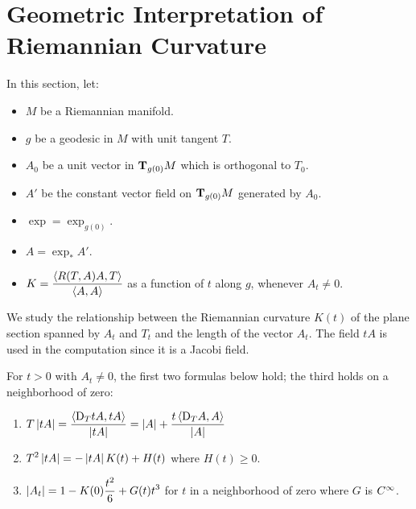 \documentclass[../main]{subfiles}
\begin{document}
\section{Geometric Interpretation of Riemannian Curvature}\label{ch10:s3}

In this section, let:
\begin{itemize}
    \item $M$ be a Riemannian manifold.
    \item $g$ be a geodesic in $M$ with unit tangent $T$.
    \item $A_0$ be a unit vector in $\ts{M}{g(0)}$ which is orthogonal to $T_0$.
    \item $A'$ be the constant vector field on $\ts{M}{g(0)}$ generated by $A_0$.
    \item $\exp = \exp_{g(0)}$.
    \item $A = \exp_*A'$.
    \item $K = \dfrac{\ip{R(T,A)A}{T}}{\ip AA}$ as a function of $t$ along $g$, whenever $A_t\ne0$.
\end{itemize}
We study the relationship between the Riemannian curvature $K(t)$ of the plane section spanned by $A_t$ and $T_t$ and the length of the vector $A_t$. The field $tA$ is used in the computation since it is a Jacobi field.



\begin{lemma} \label{lem:ch10.3.1}
For $t>0$ with $A_t\ne0$, the first two formulas below hold; the third holds on a neighborhood of zero:
\begin{enumerate}[label=(\arabic*)]
    
    \item \label{enu:ch10s3.1}
    $\displaystyle T\norm{tA} = \frac{\ip{\D_TtA}{tA}}{\norm{tA}}
    = \norm A + \frac{t\ip{\D_TA}{A}}{\norm A}$
    
    \item \label{enu:ch10s3.2}
    $\displaystyle T^2\norm{tA} = -\norm{tA}K(t) + H(t)$ where $H(t)\ge0$.
    
    \item \label{enu:ch10s3.3}
    $\displaystyle \norm{A_t} = 1 - K(0)\frac{t^2}{6} + G(t)t^3$ for $t$ in a neighborhood of zero where $G$ is $\CInfty$.
    
\end{enumerate}
\end{lemma}
\end{document}
